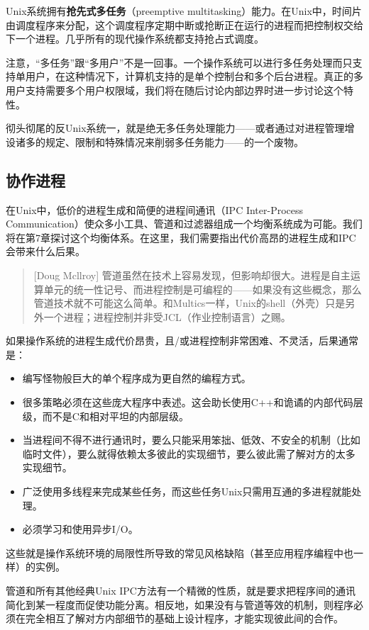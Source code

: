 \documentclass[12pt,oneside]{book}
\begin{document}
\begin{common-format}
Unix系统拥有\textbf{抢先式多任务}（preemptive multitasking）能力。在Unix中，时间片由调度程序来分配，这个调度程序定期中断或抢断正在运行的进程而把控制权交给下一个进程。几乎所有的现代操作系统都支持抢占式调度。

注意，“多任务”跟“多用户”不是一回事。一个操作系统可以进行多任务处理而只支持单用户，在这种情况下，计算机支持的是单个控制台和多个后台进程。真正的多用户支持需要多个用户权限域，我们将在随后讨论内部边界时进一步讨论这个特性。

彻头彻尾的反Unix系统一，就是绝无多任务处理能力——或者通过对进程管理增设诸多的规定、限制和特殊情况来削弱多任务能力——的一个废物。

\subsection{协作进程}
在Unix中，低价的进程生成和简便的进程间通讯（IPC Inter-Process Communication）使众多小工具、管道和过滤器组成一个均衡系统成为可能。我们将在第7章探讨这个均衡体系。在这里，我们需要指出代价高昂的进程生成和IPC会带来什么后果。

\begin{quote}[Doug Mcllroy]
管道虽然在技术上容易发现，但影响却很大。进程是自主运算单元的统一性记号、而进程控制是可编程的——如果没有这些概念，那么管道技术就不可能这么简单。和Multics一样，Unix的shell（外壳）只是另外一个进程；进程控制并非受JCL（作业控制语言）之赐。
\end{quote}

如果操作系统的进程生成代价昂贵，且/或进程控制非常困难、不灵活，后果通常是：
\begin{itemize}
\item 编写怪物般巨大的单个程序成为更自然的编程方式。
\item 很多策略必须在这些庞大程序中表述。这会助长使用C++和诡谲的内部代码层级，而不是C和相对平坦的内部层级。
\item 当进程间不得不进行通讯时，要么只能采用笨拙、低效、不安全的机制（比如临时文件），要么就得依赖太多彼此的实现细节，要么彼此需了解对方的太多实现细节。
\item 广泛使用多线程来完成某些任务，而这些任务Unix只需用互通的多进程就能处理。
\item 必须学习和使用异步I/O。
\end{itemize}

这些就是操作系统环境的局限性所导致的常见风格缺陷（甚至应用程序编程中也一样）的实例。

管道和所有其他经典Unix IPC方法有一个精微的性质，就是要求把程序间的通讯简化到某一程度而促使功能分离。相反地，如果没有与管道等效的机制，则程序必须在完全相互了解对方内部细节的基础上设计程序，才能实现彼此间的合作。


\end{common-format}
\end{document}
